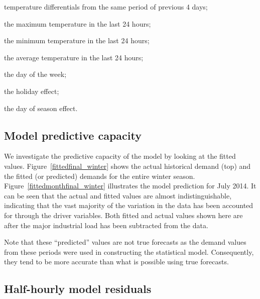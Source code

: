 \documentclass[11pt]{article}
\begin{document}
\item temperature differentials from the same period of previous 4 days;

\item the maximum temperature in the last 24 hours;

\item the minimum temperature in the last 24 hours;

\item the average temperature in the last 24 hours;

\item the day of the week;

\item the holiday  effect;

\item the day of season effect.
\eiz


\subsection{Model predictive capacity}

We investigate the predictive capacity of the model by looking at the fitted values. Figure~\ref{fittedfinal_winter} shows the actual historical demand (top) and the fitted (or predicted) demands for the entire winter season. Figure~\ref{fittedmonthfinal_winter} illustrates the model prediction for July 2014. It can be seen that the actual and fitted values are almost indistinguishable, indicating that the vast majority of the variation in the data has been accounted for through the driver variables. Both fitted and actual values shown here are after the major industrial load has been subtracted from the data.




Note that these ``predicted'' values are not true forecasts as the demand values from these periods were used in constructing the statistical model. Consequently, they tend to be more accurate than what is possible using true forecasts.


\subsection{Half-hourly model residuals}
\end{document}
